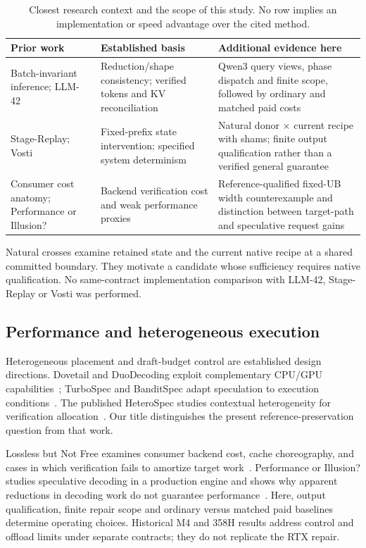 \begin{table}[t]\centering\small
\caption{Closest research context and the scope of this study. No row implies an implementation or speed advantage over the cited method.}
\label{tab:related}
\begin{tabularx}{\linewidth}{@{}p{.23\linewidth}XX@{}}\toprule
Prior work & Established basis & Additional evidence here\\\midrule
Batch-invariant inference; LLM-42~\cite{thinkingmachines,llm42} & Reduction/shape consistency; verified tokens and KV reconciliation & Qwen3 query views, phase dispatch and finite scope, followed by ordinary and matched paid costs\\
Stage-Replay; Vosti~\cite{stagereplay,vosti} & Fixed-prefix state intervention; specified system determinism & Natural donor $\times$ current recipe with shams; finite output qualification rather than a verified general guarantee\\
Consumer cost anatomy; Performance or Illusion?~\cite{lossless,illusion} & Backend verification cost and weak performance proxies & Reference-qualified fixed-UB width counterexample and distinction between target-path and speculative request gains\\\bottomrule
\end{tabularx}
\end{table}

Natural crosses examine retained state and the current native recipe at a shared committed boundary. They motivate a candidate whose sufficiency requires native qualification. No same-contract implementation comparison with LLM-42, Stage-Replay or Vosti was performed.

\subsection{Performance and heterogeneous execution}
Heterogeneous placement and draft-budget control are established design directions. Dovetail and DuoDecoding exploit complementary CPU/GPU capabilities~\cite{dovetail,duodecoding}; TurboSpec and BanditSpec adapt speculation to execution conditions~\cite{turbospec,banditspec}. The published HeteroSpec studies contextual heterogeneity for verification allocation~\cite{aclheterospec}. Our title distinguishes the present reference-preservation question from that work.

Lossless but Not Free examines consumer backend cost, cache choreography, and cases in which verification fails to amortize target work~\cite{lossless}. Performance or Illusion? studies speculative decoding in a production engine and shows why apparent reductions in decoding work do not guarantee performance~\cite{illusion}. Here, output qualification, finite repair scope and ordinary versus matched paid baselines determine operating choices. Historical M4 and 358H results address control and offload limits under separate contracts; they do not replicate the RTX repair.

